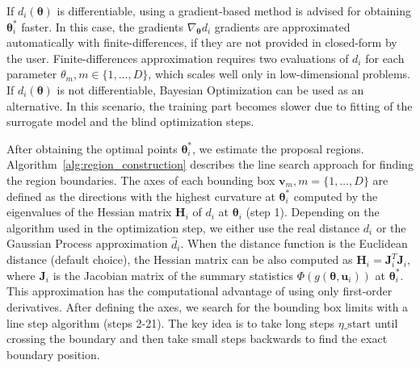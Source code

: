 \documentclass[article, shortnames]{jss}
\newcommand{\vb}{\mathbf{v}}
\newcommand{\ub}{\mathbf{u}}
\newcommand{\jac}{\mathbf{J}}
\newcommand{\hessian}{\mathbf{H}}
\newcommand{\thetab}{\boldsymbol{\theta}}
\begin{document}
If \(d_i(\thetab)\) is differentiable, using a gradient-based method
is advised for obtaining \(\thetab_i^*\) faster. In this case, the
gradients \(\nabla_{\thetab} d_i\) gradients are approximated
automatically with finite-differences, if they are not provided in
closed-form by the user. Finite-differences approximation requires two
evaluations of \(d_i\) for each parameter
\(\theta_m, m \in \{1, \ldots, D\}\), which scales well only in
low-dimensional problems. If \(d_i(\thetab)\) is not differentiable,
Bayesian Optimization can be used as an alternative. In this scenario,
the training part becomes slower due to fitting of the surrogate model
and the blind optimization steps.

After obtaining the optimal points \(\thetab^*_i\), we estimate the
proposal regions. Algorithm~\ref{alg:region_construction} describes
the line search approach for finding the region boundaries. The axes
of each bounding box \(\vb_m, m = \{1, \ldots, D\}\) are defined as
the directions with the highest curvature at \(\thetab_i^*\) computed
by the eigenvalues of the Hessian matrix \(\hessian_i\) of \(d_i\) at
\(\thetab_i\) (step 1). Depending on the algorithm used in the
optimization step, we either use the real distance \(d_i\) or the
Gaussian Process approximation \(\hat{d}_i\). When the distance
function is the Euclidean distance (default choice), the Hessian
matrix can be also computed as \(\hessian_i = \jac_i^T\jac_i\), where
\(\jac_i\) is the Jacobian matrix of the summary statistics
\(\Phi(g(\thetab, \ub_i))\) at \(\thetab_i^*\). This approximation has
the computational advantage of using only first-order
derivatives. After defining the axes, we search for the bounding box
limits with a line step algorithm (steps 2-21). The key idea is to
take long steps \(\eta\_\text{start}\) until crossing the boundary and
then take small steps backwards to find the exact boundary position.
\end{document}
